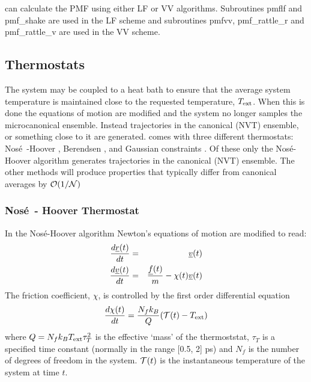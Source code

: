 \D{} can calculate the PMF using either LF or VV algorithms.
Subroutines {\sc pmflf} and {\sc pmf\_shake} are used in the LF scheme
and subroutines {\sc pmfvv, pmf\_rattle\_r} and {\sc pmf\_rattle\_v}
are used in the VV scheme.

\subsection{Thermostats}

The system may be coupled to a heat bath to ensure that the average
system temperature is maintained close to the requested temperature,
$T_{\rm ext}$. When this is done the equations of motion are modified
and the system no longer samples the microcanonical
ensemble. Instead trajectories in the canonical
(NVT) ensemble, or something close to it are
generated. \D{} comes with three different thermostats: Nos\'e~-Hoover
\cite{hoover-85a}, Berendsen \cite{berendsen-84a}, and Gaussian
constraints \cite{evans-84a}. Of these
only the Nos\'e-Hoover algorithm generates trajectories in the
canonical (NVT) ensemble. The other methods will produce properties
that typically differ from canonical averages by ${\cal O}(1/{\cal
N})$ \cite{allen-89a}

\subsubsection{Nos\'e~- Hoover Thermostat}

In the Nos\'e-Hoover algorithm \cite{hoover-85a}
Newton's equations of motion are modified to read:
\begin{eqnarray}
{d \mbox{$\underline{r}$}(t) \over d t}& =& \mbox{$\underline{v}$}(t)\nonumber \\ {d \mbox{$\underline{v}$}(t)
\over d t}& =& {\mbox{$\underline{f}$}(t)\over m} - \chi(t) \mbox{$\underline{v}$}(t)\\
\end{eqnarray}
The friction coefficient, $\chi$, is controlled by the first order
differential equation
\begin{equation}
{d\chi(t) \over dt} = {N_fk_B \over Q}( {\cal T}(t)-T_{\rm ext} )
\end{equation}
where $Q=N_fk_B T_{\rm ext}\tau_T^2$ is the effective `mass' of the
thermoststat, $\tau_T$ is a specified time constant (normally in the
range [0.5, 2] ps) and $N_f$ is the number of degrees of freedom in
the system. ${\cal T}(t)$ is the instantaneous temperature of the
system at time $t$.

